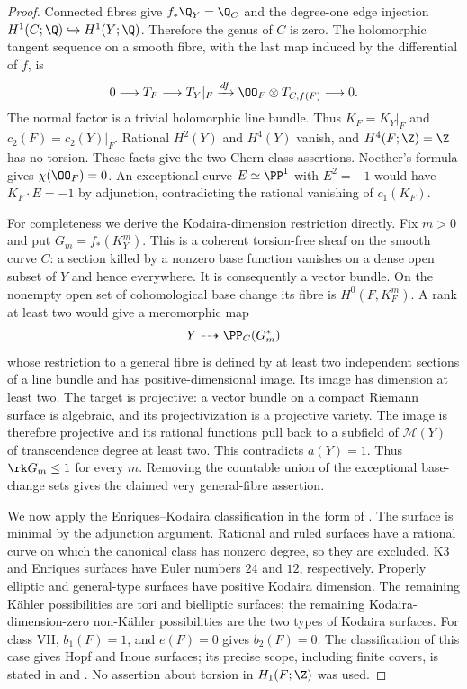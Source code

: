 \begin{proof}
Connected fibres give $f_*\Q_Y=\Q_C$ and the degree-one edge injection
$H^1(C;\Q)\hookrightarrow H^1(Y;\Q)$. Therefore the genus of $C$ is
zero. The holomorphic tangent sequence on a smooth fibre, with the
last map induced by the differential of $f$, is
\[
0\longrightarrow T_F\longrightarrow T_Y|_F
 \xrightarrow{df} \OO_F\otimes T_{C,f(F)}\longrightarrow0.
\]
The normal factor is a trivial holomorphic line bundle. Thus
$K_F=K_Y|_F$ and $c_2(F)=c_2(Y)|_F$. Rational $H^2(Y)$ and $H^4(Y)$
vanish, and $H^4(F;\Z)=\Z$ has no torsion. These facts give the two
Chern-class assertions. Noether's formula gives $\chi(\OO_F)=0$.
An exceptional curve $E\simeq\PP^1$ with $E^2=-1$ would have
$K_F\cdot E=-1$ by adjunction, contradicting the rational vanishing of
$c_1(K_F)$.

For completeness we derive the Kodaira-dimension restriction directly.
Fix $m>0$ and put $G_m=f_*(K_Y^m)$. This is a coherent torsion-free
sheaf on the smooth curve $C$: a section killed by a nonzero base
function vanishes on a dense open subset of $Y$ and hence everywhere.
It is consequently a vector bundle. On the nonempty open set of
cohomological base change its fibre is $H^0(F,K_F^m)$. A rank at least
two would give a meromorphic map
\[
 Y\dashrightarrow \PP_C(G_m^*)
\]
whose restriction to a general fibre is defined by at least two
independent sections of a line bundle and has positive-dimensional
image. Its image has dimension at least two. The target is projective:
a vector bundle on a compact Riemann surface is algebraic, and its
projectivization is a projective variety. The image is therefore
projective and its rational functions pull back to a subfield of
$\mathcal M(Y)$ of transcendence degree at least two. This contradicts
$a(Y)=1$. Thus $\rk G_m\leq1$ for every $m$. Removing the countable
union of the exceptional base-change sets gives the claimed very
general-fibre assertion.

We now apply the Enriques--Kodaira classification in the form of
\cite[Theorem 3.1]{Peters1990}. The surface is minimal by the
adjunction argument. Rational and ruled surfaces have a rational
curve on which the canonical class has nonzero degree, so they are
excluded. K3 and Enriques surfaces have Euler numbers $24$ and $12$,
respectively. Properly elliptic and general-type surfaces have
positive Kodaira dimension. The remaining K\"ahler possibilities are
tori and bielliptic surfaces; the remaining Kodaira-dimension-zero
non-K\"ahler possibilities are the two types of Kodaira surfaces.
For class VII, $b_1(F)=1$, and $e(F)=0$ gives $b_2(F)=0$. The
classification of this case gives Hopf and Inoue surfaces; its
precise scope, including finite covers, is stated in
\cite[p.~2]{Teleman2008} and \cite[Theorem 1]{BBK2019}.
No assertion about torsion in $H_1(F;\Z)$ was used.
\end{proof}



